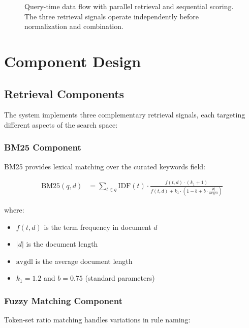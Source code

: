 \begin{figure}[ht]
\caption{Query-time data flow with parallel retrieval and sequential scoring. The three retrieval signals operate independently before normalization and combination.}
\label{fig:query-flow}
\end{figure}

\section{Component Design}

\subsection{Retrieval Components}

The system implements three complementary retrieval signals, each targeting different aspects of the search space:

\subsubsection{BM25 Component}

BM25 provides lexical matching over the curated keywords field:

\begin{align}
\text{BM25}(q, d) &= \sum_{t \in q} \text{IDF}(t) \cdot \frac{f(t, d) \cdot (k_1 + 1)}{f(t, d) + k_1 \cdot (1 - b + b \cdot \frac{|d|}{\text{avgdl}})}
\end{align}

where:
\begin{itemize}[leftmargin=*,itemsep=1pt,topsep=1pt]
  \item $f(t, d)$ is the term frequency in document $d$
  \item $|d|$ is the document length
  \item $\text{avgdl}$ is the average document length
  \item $k_1 = 1.2$ and $b = 0.75$ (standard parameters)
\end{itemize}

\subsubsection{Fuzzy Matching Component}

Token-set ratio matching handles variations in rule naming:


